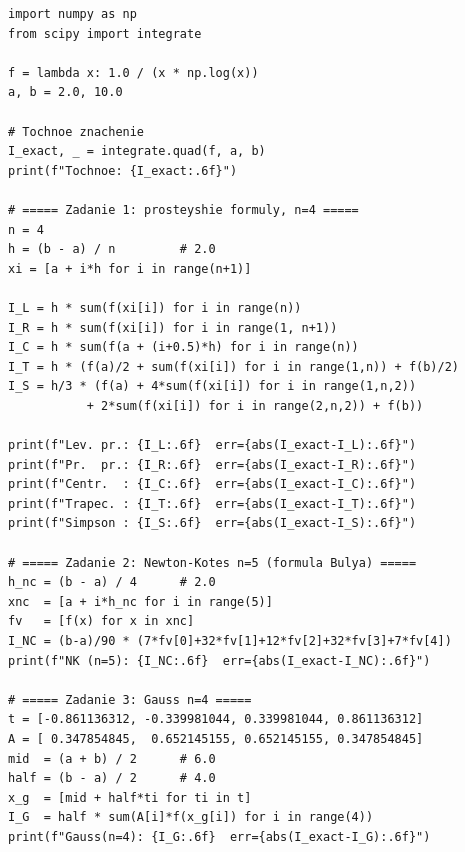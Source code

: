 \documentclass[a4paper, final]{article}
\begin{document}
\begin{lstlisting}[caption={Численное интегрирование (Python)}, label=lst:code]
import numpy as np
from scipy import integrate

f = lambda x: 1.0 / (x * np.log(x))
a, b = 2.0, 10.0

# Tochnoe znachenie
I_exact, _ = integrate.quad(f, a, b)
print(f"Tochnoe: {I_exact:.6f}")

# ===== Zadanie 1: prosteyshie formuly, n=4 =====
n = 4
h = (b - a) / n         # 2.0
xi = [a + i*h for i in range(n+1)]

I_L = h * sum(f(xi[i]) for i in range(n))
I_R = h * sum(f(xi[i]) for i in range(1, n+1))
I_C = h * sum(f(a + (i+0.5)*h) for i in range(n))
I_T = h * (f(a)/2 + sum(f(xi[i]) for i in range(1,n)) + f(b)/2)
I_S = h/3 * (f(a) + 4*sum(f(xi[i]) for i in range(1,n,2))
           + 2*sum(f(xi[i]) for i in range(2,n,2)) + f(b))

print(f"Lev. pr.: {I_L:.6f}  err={abs(I_exact-I_L):.6f}")
print(f"Pr.  pr.: {I_R:.6f}  err={abs(I_exact-I_R):.6f}")
print(f"Centr.  : {I_C:.6f}  err={abs(I_exact-I_C):.6f}")
print(f"Trapec. : {I_T:.6f}  err={abs(I_exact-I_T):.6f}")
print(f"Simpson : {I_S:.6f}  err={abs(I_exact-I_S):.6f}")

# ===== Zadanie 2: Newton-Kotes n=5 (formula Bulya) =====
h_nc = (b - a) / 4      # 2.0
xnc  = [a + i*h_nc for i in range(5)]
fv   = [f(x) for x in xnc]
I_NC = (b-a)/90 * (7*fv[0]+32*fv[1]+12*fv[2]+32*fv[3]+7*fv[4])
print(f"NK (n=5): {I_NC:.6f}  err={abs(I_exact-I_NC):.6f}")

# ===== Zadanie 3: Gauss n=4 =====
t = [-0.861136312, -0.339981044, 0.339981044, 0.861136312]
A = [ 0.347854845,  0.652145155, 0.652145155, 0.347854845]
mid  = (a + b) / 2      # 6.0
half = (b - a) / 2      # 4.0
x_g  = [mid + half*ti for ti in t]
I_G  = half * sum(A[i]*f(x_g[i]) for i in range(4))
print(f"Gauss(n=4): {I_G:.6f}  err={abs(I_exact-I_G):.6f}")
\end{lstlisting}
\end{document}
